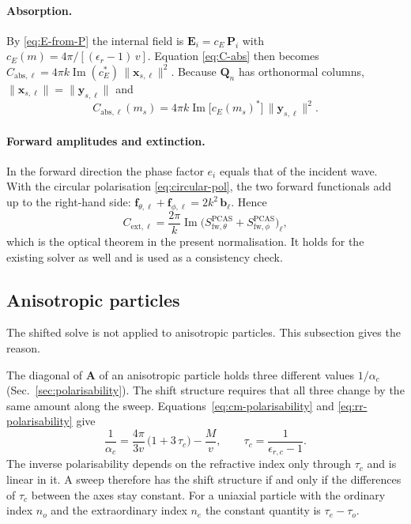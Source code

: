 \documentclass[11pt,a4paper]{article}
\begin{document}
\paragraph{Absorption.}
By \eqref{eq:E-from-P} the internal field is
$\bm{E}_i = c_E\, \bm{P}_i$ with
$c_E(m) = 4\pi / [(\epsilon_r - 1)\, v]$.
Equation \eqref{eq:C-abs} then becomes
$C_{\text{abs},\ell} = 4\pi k \operatorname{Im}(c_E^*)\, \| \bm{x}_{s,\ell} \|^2$.
Because $\mathbf{Q}_n$ has orthonormal columns,
$\| \bm{x}_{s,\ell} \| = \| \bm{y}_{s,\ell} \|$ and
\begin{equation}
  C_{\text{abs},\ell}(m_s)
    = 4\pi k \operatorname{Im}\bigl[ c_E(m_s)^* \bigr]\,
      \| \bm{y}_{s,\ell} \|^2 .
  \label{eq:C-abs-shifted}
\end{equation}

\paragraph{Forward amplitudes and extinction.}
In the forward direction the phase factor $e_i$ equals that of the
incident wave.
With the circular polarisation \eqref{eq:circular-pol}, the two forward
functionals add up to the right-hand side:
$\bm{f}_{\theta,\ell} + \bm{f}_{\phi,\ell} = 2k^2\, \bm{b}_\ell$.
Hence
\begin{equation}
  C_{\text{ext},\ell}
    = \frac{2\pi}{k} \operatorname{Im}
      \bigl( S_{\text{fw},\theta}^{\text{PCAS}}
           + S_{\text{fw},\phi}^{\text{PCAS}} \bigr)_\ell ,
  \label{eq:optical-theorem}
\end{equation}
which is the optical theorem in the present normalisation.
It holds for the existing solver as well and is used as a consistency
check.

\subsection{Anisotropic particles}
\label{sec:shift-anisotropic}

The shifted solve is not applied to anisotropic particles.
This subsection gives the reason.

The diagonal of $\mathbf{A}$ of an anisotropic particle holds three
different values $1/\alpha_c$ (Sec.~\ref{sec:polarisability}).
The shift structure requires that all three change by the same amount
along the sweep.
Equations~\eqref{eq:cm-polarisability} and \eqref{eq:rr-polarisability}
give
\begin{equation}
  \frac{1}{\alpha_c}
    = \frac{4\pi}{3v}\,\bigl(1 + 3\,\tau_c\bigr) - \frac{M}{v},
  \qquad
  \tau_c = \frac{1}{\epsilon_{r,c} - 1} .
  \label{eq:inv-alpha-tau}
\end{equation}
The inverse polarisability depends on the refractive index only
through $\tau_c$ and is linear in it.
A sweep therefore has the shift structure if and only if the
differences of $\tau_c$ between the axes stay constant.
For a uniaxial particle with the ordinary index $n_o$ and the
extraordinary index $n_e$ the constant quantity is $\tau_e - \tau_o$.
\end{document}

